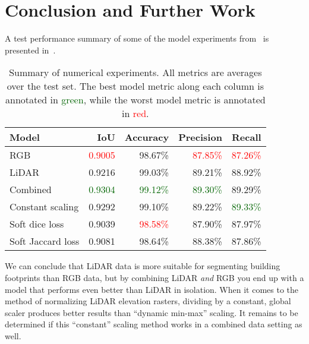 \section*{Conclusion and Further Work}

A test performance summary of some of the model experiments from~ is presented in~.

\begin{table}[H]
  \centering
  \begin{tabular}{lrrrr}
    \toprule
    Model &                           IoU &                       Accuracy &                      Precision &                         Recall \\
    \midrule
    RGB               &       \textcolor{red}{0.9005} &                        98.67\% &       \textcolor{red}{87.85\%} &       \textcolor{red}{87.26\%} \\
    LiDAR             &                        0.9216 &                        99.03\% &                        89.21\% &                        88.92\% \\
    Combined          & \textcolor{darkgreen}{0.9304} & \textcolor{darkgreen}{99.12\%} & \textcolor{darkgreen}{89.30\%} &                        89.29\% \\
    Constant scaling  &                        0.9292 &                        99.10\% &                        89.22\% & \textcolor{darkgreen}{89.33\%} \\
    Soft dice loss    &                        0.9039 &       \textcolor{red}{98.58\%} &                        87.90\% &                        87.97\% \\
    Soft Jaccard loss &                        0.9081 &                        98.64\% &                        88.38\% &                        87.86\% \\
    \bottomrule
  \end{tabular}
  \caption{%
    Summary of numerical experiments.
    All metrics are averages over the test set.
    The best model metric along each column is annotated in \textcolor{darkgreen}{green}, while the worst model metric is annotated in \textcolor{red}{red}.
  }%
  \label{tab:experiment-summary}
\end{table} 
%
We can conclude that LiDAR data is more suitable for segmenting building footprints than RGB data, but by combining LiDAR \emph{and} RGB you end up with a model that performs even better than LiDAR in isolation.
When it comes to the method of normalizing LiDAR elevation rasters, dividing by a constant, global scaler produces better results than \enquote{dynamic min-max} scaling.
It remains to be determined if this \enquote{constant} scaling method works in a combined data setting as well.

